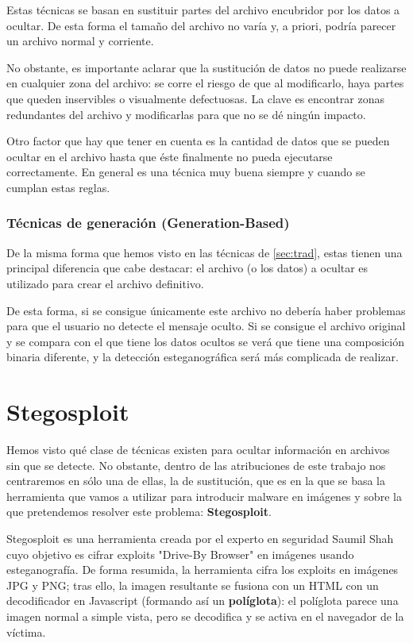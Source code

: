 Estas técnicas se basan en sustituir partes del archivo encubridor por los datos a ocultar. De esta forma el tamaño del archivo no varía y, a priori, podría parecer un archivo normal y corriente.

No obstante, es importante aclarar que la sustitución de datos no puede realizarse en cualquier zona del archivo: se corre el riesgo de que al modificarlo, haya partes que queden inservibles o visualmente defectuosas. La clave es encontrar zonas redundantes del archivo y modificarlas para que no se dé ningún impacto.

Otro factor que hay que tener en cuenta es la cantidad de datos que se pueden ocultar en el archivo hasta que éste finalmente no pueda ejecutarse correctamente. En general es una técnica muy buena siempre y cuando se cumplan estas reglas.

\subsubsection{Técnicas de generación (Generation-Based)}

De la misma forma que hemos visto en las técnicas de \ref{sec:trad}, estas tienen una principal diferencia que cabe destacar: el archivo (o los datos) a ocultar es utilizado para crear el archivo definitivo.

De esta forma, si se consigue únicamente este archivo no debería haber problemas para que el usuario no detecte el mensaje oculto. Si se consigue el archivo original y se compara con el que tiene los datos ocultos se verá que tiene una composición binaria diferente, y la detección esteganográfica será más complicada de realizar.

\section{Stegosploit}

Hemos visto qué clase de técnicas existen para ocultar información en archivos sin que se detecte. No obstante, dentro de las atribuciones de este trabajo nos centraremos en sólo una de ellas, la de sustitución, que es en la que se basa la herramienta que vamos a utilizar para introducir malware en imágenes y sobre la que pretendemos resolver este problema: \textbf{Stegosploit}. %

Stegosploit es una herramienta creada por el experto en seguridad Saumil Shah cuyo objetivo es cifrar exploits "Drive-By Browser" en imágenes usando esteganografía. De forma resumida, la herramienta cifra los exploits en imágenes JPG y PNG; tras ello, la imagen resultante se fusiona con un HTML con un decodificador en Javascript (formando así un \textbf{políglota}): el políglota parece una imagen normal a simple vista, pero se decodifica y se activa en el navegador de la víctima. %

